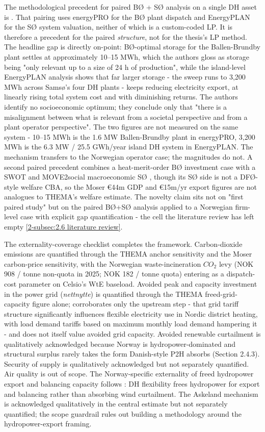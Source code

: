 The methodological precedent for paired BØ + SØ analysis on a single DH asset is \cite{ostergaard_business_2019}. That pairing uses energyPRO for the BØ plant dispatch and EnergyPLAN for the SØ system valuation, neither of which is a custom-coded LP. It is therefore a precedent for the paired \emph{structure}, not for the thesis's LP method. The headline gap is directly on-point: BØ-optimal storage for the Ballen-Brundby plant settles at approximately 10–15 MWh, which the authors gloss as storage being "only relevant up to a size of 24 h of production", while the island-level EnergyPLAN analysis shows that far larger storage - the sweep runs to 3,200 MWh across Samsø's four DH plants - keeps reducing electricity export, at linearly rising total system cost and with diminishing returns. The authors identify no socioeconomic optimum; they conclude only that "there is a misalignment between what is relevant from a societal perspective and from a plant operator perspective". The two figures are not measured on the same system - 10–15 MWh is the 1.6 MW Ballen-Brundby plant in energyPRO, 3,200 MWh is the 6.3 MW / 25.5 GWh/year island DH system in EnergyPLAN. The mechanism transfers to the Norwegian operator case; the magnitudes do not. A second paired precedent combines a heat-merit-order BØ investment case with a SWOT and MOVE2social macroeconomic SØ \cite{moser_socioeconomic_2018}, though its SØ side is not a DFØ-style welfare CBA, so the Moser €44m GDP and €15m/yr export figures are not analogues to THEMA's welfare estimate. The novelty claim sits not on "first paired study" but on the paired BØ+SØ analysis applied to a Norwegian firm-level case with explicit gap quantification - the cell the literature review has left empty \autoref{2-subsec:2.6 literature review}.

The externality-coverage checklist completes the framework. Carbon-dioxide emissions are quantified through the THEMA anchor sensitivity and the Moser carbon-price sensitivity, with the Norwegian waste-incineration $CO_2$ levy (NOK 908 / tonne non-quota in 2025; NOK 182 / tonne quota) entering as a dispatch-cost parameter on Celsio's WtE baseload. Avoided peak and capacity investment in the power grid (\emph{nettnytte}) is quantified through the THEMA freed-grid-capacity figure alone; \cite{sandberg_energy_2019} corroborates only the upstream step - that grid tariff structure significantly influences flexible electricity use in Nordic district heating, with load demand tariffs based on maximum monthly load demand hampering it - and does not itself value avoided grid capacity. Avoided renewable curtailment is qualitatively acknowledged because Norway is hydropower-dominated and structural surplus rarely takes the form Danish-style P2H absorbs (Section 2.4.3). Security of supply is qualitatively acknowledged but not separately quantified. Air quality is out of scope. The Norway-specific externality of freed hydropower export and balancing capacity follows \cite{askeland_balancing_2019}: DH flexibility frees hydropower for export and balancing rather than absorbing wind curtailment. The Askeland mechanism is acknowledged qualitatively in the central estimate but not separately quantified; the scope guardrail rules out building a methodology around the hydropower-export framing.

